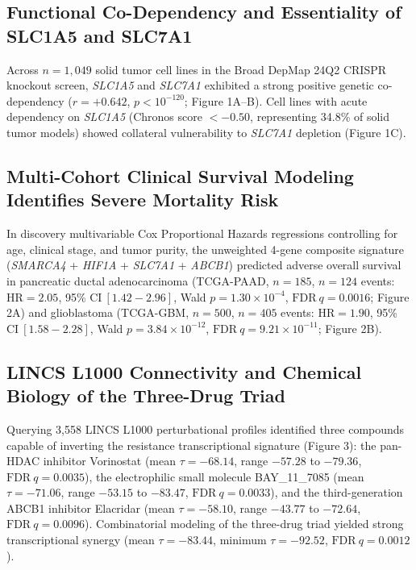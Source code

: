 \documentclass[11pt,a4paper]{article}
\begin{document}
\subsection{Functional Co-Dependency and Essentiality of SLC1A5 and SLC7A1}
Across $n = 1,049$ solid tumor cell lines in the Broad DepMap 24Q2 CRISPR knockout screen, \textit{SLC1A5} and \textit{SLC7A1} exhibited a strong positive genetic co-dependency ($r = +0.642$, $p < 10^{-120}$; Figure 1A--B). Cell lines with acute dependency on \textit{SLC1A5} (Chronos score $< -0.50$, representing 34.8\% of solid tumor models) showed collateral vulnerability to \textit{SLC7A1} depletion (Figure 1C).

\subsection{Multi-Cohort Clinical Survival Modeling Identifies Severe Mortality Risk}
In discovery multivariable Cox Proportional Hazards regressions controlling for age, clinical stage, and tumor purity, the unweighted 4-gene composite signature (\textit{SMARCA4} + \textit{HIF1A} + \textit{SLC7A1} + \textit{ABCB1}) predicted adverse overall survival in pancreatic ductal adenocarcinoma (TCGA-PAAD, $n = 185$, $n = 124$ events: $\text{HR} = 2.05$, 95\% $\text{CI}~[1.42 - 2.96]$, Wald $p = 1.30 \times 10^{-4}$, $\text{FDR}~q = 0.0016$; Figure 2A) and glioblastoma (TCGA-GBM, $n = 500$, $n = 405$ events: $\text{HR} = 1.90$, 95\% $\text{CI}~[1.58 - 2.28]$, Wald $p = 3.84 \times 10^{-12}$, $\text{FDR}~q = 9.21 \times 10^{-11}$; Figure 2B).

\subsection{LINCS L1000 Connectivity and Chemical Biology of the Three-Drug Triad}
Querying 3,558 LINCS L1000 perturbational profiles identified three compounds capable of inverting the resistance transcriptional signature (Figure 3): the pan-HDAC inhibitor Vorinostat (mean $\tau = -68.14$, range $-57.28$ to $-79.36$, $\text{FDR}~q = 0.0035$), the electrophilic small molecule BAY\_11\_7085 (mean $\tau = -71.06$, range $-53.15$ to $-83.47$, $\text{FDR}~q = 0.0033$), and the third-generation ABCB1 inhibitor Elacridar (mean $\tau = -58.10$, range $-43.77$ to $-72.64$, $\text{FDR}~q = 0.0096$). Combinatorial modeling of the three-drug triad yielded strong transcriptional synergy (mean $\tau = -83.44$, minimum $\tau = -92.52$, $\text{FDR}~q = 0.0012$).
\end{document}
